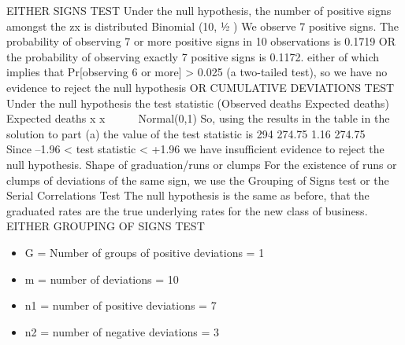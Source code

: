 \documentclass[a4paper,12pt]{article}
\begin{document}
EITHER SIGNS TEST
Under the null hypothesis, the number of positive signs amongst the zx is
distributed Binomial (10, ½ )
We observe 7 positive signs.
The probability of observing 7 or more positive signs in 10 observations is
0.1719
OR
the probability of observing exactly 7 positive signs is 0.1172.
either of which implies that Pr[observing 6 or more] > 0.025 (a two-tailed
test),
so we have no evidence to reject the null hypothesis
OR CUMULATIVE DEVIATIONS TEST
Under the null hypothesis
the test statistic
(Observed deaths Expected deaths)
Expected deaths
x
x
 

~ Normal(0,1)
So, using the results in the table in the solution to part (a) the value of the test
statistic is
294 274.75 1.16
274.75


Since –1.96 < test statistic < +1.96
we have insufficient evidence to reject the null hypothesis.
Shape of graduation/runs or clumps
For the existence of runs or clumps of deviations of the same sign, we use the
Grouping of Signs test or the Serial Correlations Test
The null hypothesis is the same as before, that the graduated rates are the true
underlying rates for the new class of business.
EITHER GROUPING OF SIGNS TEST
\begin{itemize}
    \item G = Number of groups of positive deviations = 1
    \item m = number of deviations = 10
    \item n1 = number of positive deviations = 7
    \item n2 = number of negative deviations = 3
\end{itemize}
\end{document}
